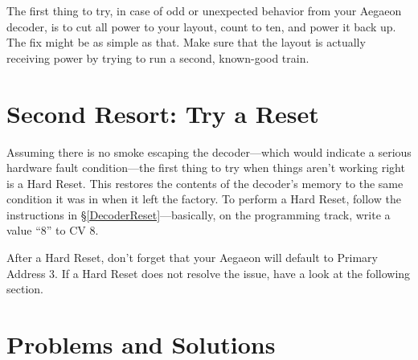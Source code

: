 \documentclass[12pt,letterpaper,draft]{memoir} %
\begin{document}
The first thing to try, in case of odd or unexpected behavior from your Aegaeon decoder, is to cut all power to your layout, count to ten, and power it back up. The fix might be as simple as that. Make sure that the layout is actually receiving power by trying to run a second, known-good train.

\section{Second Resort: Try a Reset}

Assuming there is no smoke escaping the decoder---which would indicate a serious hardware fault condition---the first thing to try when things aren't working right is a Hard Reset. This restores the contents of the decoder's memory to the same condition it was in when it left the factory. To perform a Hard Reset, follow the instructions in \S\ref{DecoderReset}---basically, on the programming track, write a value ``8'' to CV 8.

After a Hard Reset, don't forget that your Aegaeon will default to Primary Address 3. If a Hard Reset does not resolve the issue, have a look at the following section.

\section{Problems and Solutions}
\label{FAQ}
\end{document}
